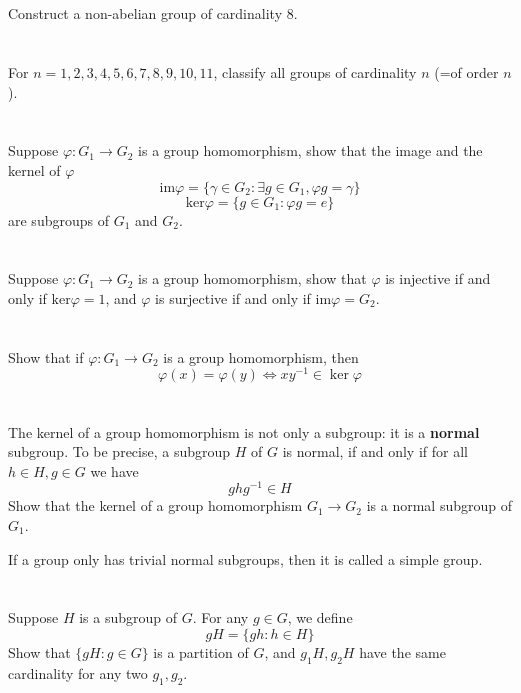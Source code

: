 \documentclass{report}
\begin{document}
\section{}
Construct a non-abelian group of cardinality $8$.
\section{}
For $n = 1,2,3,4,5,6,7,8,9,10,11$, classify all groups of cardinality $n$ (=of order $n$).
\section{}
Suppose $\varphi: G_1 \rightarrow G_2$ is a group homomorphism, show that the image and the kernel of $\varphi$
\[\text{im}\varphi = \{\gamma \in G_2: \exists g \in G_1, \varphi g =\gamma\}\]
\[\text{ker}\varphi = \{g \in G_1: \varphi g = e\}\]
are subgroups of $G_1$ and $G_2$.
\section{}
Suppose $\varphi: G_1 \rightarrow G_2$ is a group homomorphism, show that $\varphi$ is injective if and only if $\text{ker}\varphi = 1$, and $\varphi$ is surjective if and only if $\text{im}\varphi = G_2$.
\section{}
Show that if $\varphi:G_1\rightarrow G_2$ is a group homomorphism, then $$\varphi(x)=\varphi(y)\Leftrightarrow xy^{-1}\in \ker\varphi$$
\section{}
The kernel of a group homomorphism is not only a subgroup: it is a \textbf{normal} subgroup. To be precise, a subgroup $H$ of $G$ is normal, if and only if for all $h \in H, g \in G$ we have
\[ghg^{-1} \in H\]
Show that the kernel of a group homomorphism $G_1 \rightarrow G_2$ is a normal subgroup of $G_1$.

If a group only has trivial normal subgroups, then it is called a simple group.
\section{}
Suppose $H$ is a subgroup of $G$. For any $g \in G$, we define
\[gH = \{gh:h \in H\}\]
Show that $\{gH: g \in G\}$ is a partition of $G$, and $g_1H, g_2H$ have the same cardinality for any two $g_1,g_2$.
\end{document}
